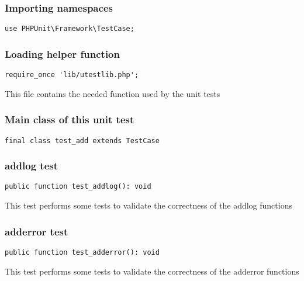 \documentclass[a4paper]{article}
\begin{document}
\hypertarget{toc20}{}
\subsubsection{Importing namespaces}

\begin{lstlisting}
use PHPUnit\Framework\TestCase;
\end{lstlisting}

\hypertarget{toc21}{}
\subsubsection{Loading helper function}

\begin{lstlisting}
require_once 'lib/utestlib.php';
\end{lstlisting}

This file contains the needed function used by the unit tests

\hypertarget{toc22}{}
\subsubsection{Main class of this unit test}

\begin{lstlisting}
final class test_add extends TestCase
\end{lstlisting}

\hypertarget{toc23}{}
\subsubsection{addlog test}

\begin{lstlisting}
public function test_addlog(): void
\end{lstlisting}

This test performs some tests to validate the correctness
of the addlog functions

\hypertarget{toc24}{}
\subsubsection{adderror test}

\begin{lstlisting}
public function test_adderror(): void
\end{lstlisting}

This test performs some tests to validate the correctness
of the adderror functions
\end{document}
